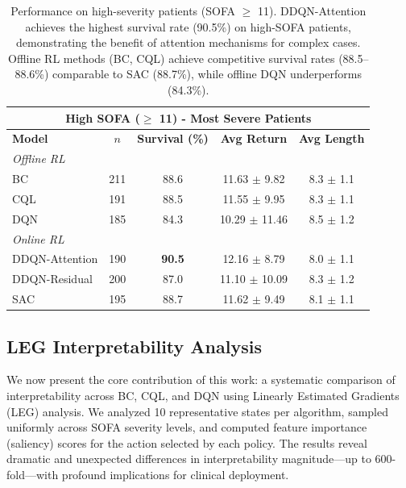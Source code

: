 \begin{table}[htbp]
\centering
\caption{Performance on high-severity patients (SOFA $\geq$ 11). DDQN-Attention achieves the highest survival rate (90.5\%) on high-SOFA patients, demonstrating the benefit of attention mechanisms for complex cases. Offline RL methods (BC, CQL) achieve competitive survival rates (88.5--88.6\%) comparable to SAC (88.7\%), while offline DQN underperforms (84.3\%).}
\label{tab:sofa-stratified}
\begin{tabular}{lcccc}
\toprule
\multicolumn{5}{c}{\textbf{High SOFA ($\geq$ 11) - Most Severe Patients}} \\
\midrule
\textbf{Model} & \textbf{$n$} & \textbf{Survival (\%)} & \textbf{Avg Return} & \textbf{Avg Length} \\
\midrule
\multicolumn{5}{l}{\textit{Offline RL}} \\
BC              & 211 & 88.6 & 11.63 $\pm$ 9.82  & 8.3 $\pm$ 1.1 \\
CQL             & 191 & 88.5 & 11.55 $\pm$ 9.95  & 8.3 $\pm$ 1.1 \\
DQN             & 185 & 84.3 & 10.29 $\pm$ 11.46 & 8.5 $\pm$ 1.2 \\
\midrule
\multicolumn{5}{l}{\textit{Online RL}} \\
DDQN-Attention  & 190 & \textbf{90.5} & 12.16 $\pm$ 8.79  & 8.0 $\pm$ 1.1 \\
DDQN-Residual   & 200 & 87.0 & 11.10 $\pm$ 10.09 & 8.3 $\pm$ 1.2 \\
SAC             & 195 & 88.7 & 11.62 $\pm$ 9.49  & 8.1 $\pm$ 1.1 \\
\bottomrule
\end{tabular}
\end{table}


\subsection{LEG Interpretability Analysis}\label{sec:results:leg}

We now present the core contribution of this work: a systematic comparison of interpretability across BC, CQL, and DQN using Linearly Estimated Gradients (LEG) analysis. We analyzed 10 representative states per algorithm, sampled uniformly across SOFA severity levels, and computed feature importance (saliency) scores for the action selected by each policy. The results reveal dramatic and unexpected differences in interpretability magnitude—up to 600-fold—with profound implications for clinical deployment.

